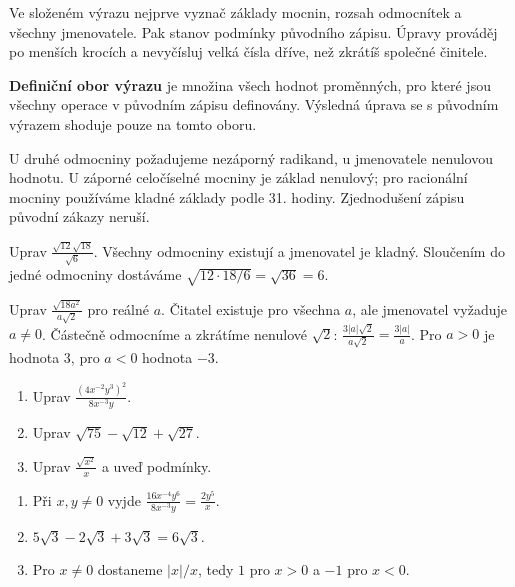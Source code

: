 \documentclass[11pt,a4paper]{article}
\begin{document}
Ve složeném výrazu nejprve vyznač základy mocnin, rozsah odmocnítek a všechny jmenovatele. Pak stanov podmínky původního zápisu. Úpravy prováděj po menších krocích a nevyčísluj velká čísla dříve, než zkrátíš společné činitele.

\begin{definiceBox}[title={Definice},breakable=false]
\textbf{Definiční obor výrazu} je množina všech hodnot proměnných, pro které jsou všechny operace v původním zápisu definovány. Výsledná úprava se s původním výrazem shoduje pouze na tomto oboru.
\end{definiceBox}


U druhé odmocniny požadujeme nezáporný radikand, u jmenovatele nenulovou hodnotu. U záporné celočíselné mocniny je základ nenulový; pro racionální mocniny používáme kladné základy podle 31. hodiny. Zjednodušení zápisu původní zákazy neruší.

\begin{prikladReseniBox}[title={Příklad 1},breakable=false]
Uprav $\frac{\sqrt{12}\sqrt{18}}{\sqrt6}$.
\tcblower
Všechny odmocniny existují a jmenovatel je kladný. Sloučením do jedné odmocniny dostáváme $\sqrt{12\cdot18/6}=\sqrt{36}=6$.
\end{prikladReseniBox}


\begin{prikladReseniBox}[title={Příklad 2},breakable=false]
Uprav $\frac{\sqrt{18a^2}}{a\sqrt2}$ pro reálné $a$.
\tcblower
Čitatel existuje pro všechna $a$, ale jmenovatel vyžaduje $a\ne0$. Částečně odmocníme a zkrátíme nenulové $\sqrt2$: $\frac{3|a|\sqrt2}{a\sqrt2}=\frac{3|a|}{a}$. Pro $a>0$ je hodnota $3$, pro $a<0$ hodnota $-3$.
\end{prikladReseniBox}



\begin{zadaniReseniBox}[title={Procvičení},breakable=false]
\begin{enumerate}[label=\alph*)]
\item Uprav $\frac{(4x^{-2}y^3)^2}{8x^{-3}y}$.
\item Uprav $\sqrt{75}-\sqrt{12}+\sqrt{27}$.
\item Uprav $\frac{\sqrt{x^2}}{x}$ a uveď podmínky.
\end{enumerate}
\tcblower
\begin{enumerate}[label=\alph*)]
\item Při $x,y\ne0$ vyjde $\frac{16x^{-4}y^6}{8x^{-3}y}=\frac{2y^5}{x}$.
\item $5\sqrt3-2\sqrt3+3\sqrt3=6\sqrt3$.
\item Pro $x\ne0$ dostaneme $|x|/x$, tedy $1$ pro $x>0$ a $-1$ pro $x<0$.
\end{enumerate}
\end{zadaniReseniBox}
\end{document}
